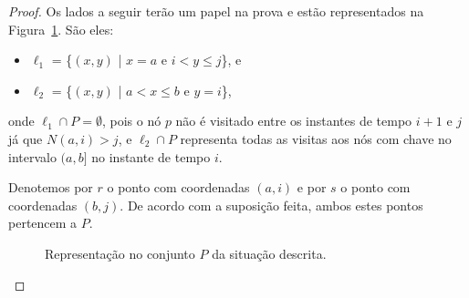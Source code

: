 \begin{proof}
Os lados a seguir terão um papel na prova e estão representados na Figura~\ref{fig:area_delimitada}. São eles:
\begin{itemize}
    \item $\ell_1$ = \{$(x,y)$ | $x = a$ e $i < y \leq j$\}, e
    \item $\ell_2$ = \{$(x,y)$ | $a < x \leq b$ e $y = i$\},
\end{itemize}
onde $\ell_1 \cap P = \emptyset$, pois o nó $p$ não é visitado entre os instantes de tempo $i+1$ e $j$ já que $N(a,i) > j$, e $\ell_2 \cap P$ representa todas as visitas aos nós com chave no intervalo $(a,b]$ no instante de tempo $i$.

Denotemos por $r$ o ponto com coordenadas $(a,i)$ e por $s$ o ponto com coordenadas $(b,j)$. De acordo com a suposição feita, ambos estes pontos pertencem a $P$.
\begin{figure}
    \centering
    \begin{adjustbox}{valign=t, raise=-25pt} %
    \end{adjustbox}
    \caption{Representação no conjunto $P$ da situação descrita.}
\label{fig:area_delimitada}
\end{figure}


\end{proof}
